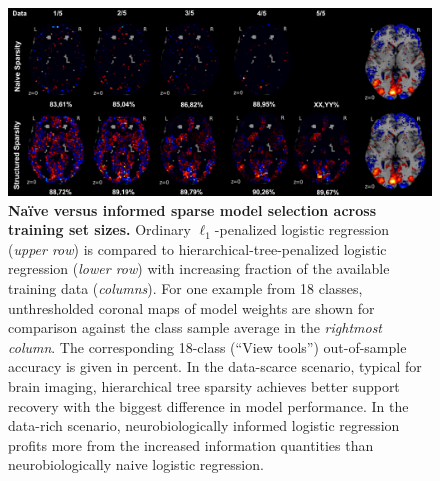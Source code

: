 \documentclass{article} %
\begin{document}
\begin{figure}
\begin{centering}
\includegraphics[width=1.00\textwidth]{figures/dataratio.pdf}
\end{centering}
\vspace{-0.6cm}
\caption{\textbf{Na\"ive versus informed sparse model selection
across training set sizes.}
Ordinary $\ell_1$-penalized logistic regression
(\textit{upper row})
is compared
to hierarchical-tree-penalized logistic regression
(\textit{lower row})
with increasing fraction
of the available training data (\textit{columns}).
For one example from 18 classes,
unthresholded coronal maps of model weights
are shown for comparison against
the class sample average
in the \textit{rightmost column}.
The corresponding 18-class (``View tools'')
out-of-sample accuracy
is given in percent.
%
In the data-scarce scenario,
typical for brain imaging,
hierarchical tree sparsity achieves
better support recovery with the biggest difference
in model performance.
%
In the data-rich scenario,
neurobiologically informed logistic regression
profits more from the increased information quantities than
neurobiologically naive logistic regression.
}
\label{fig_dataratio}
\end{figure}
\end{document}
